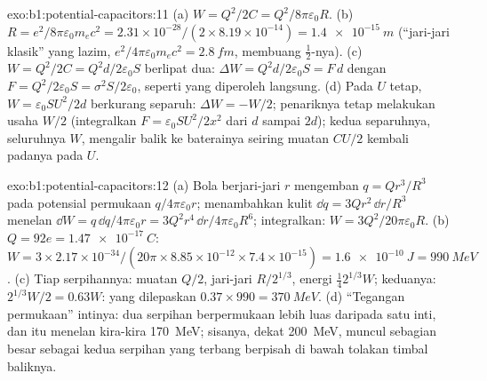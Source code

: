 \begin{solution}{exo:b1:potential-capacitors:11}
(a) $W = Q^2/2C = Q^2/8\pi\varepsilon_0R$. (b) $R = e^2/8\pi\varepsilon_0m_ec^2 = 2.31 \times
10^{-28}/(2 \times 8.19 \times 10^{-14}) = \qty{1.4e-15}{m}$ (``jari-jari klasik''
yang lazim, $e^2/4\pi\varepsilon_0m_ec^2 = \qty{2.8}{fm}$, membuang $\tfrac12$-nya). (c) $W =
Q^2/2C = Q^2d/2\varepsilon_0S$ berlipat dua: $\Delta W = Q^2d/2\varepsilon_0S = F\,d$ dengan $F =
Q^2/2\varepsilon_0S = \sigma^2S/2\varepsilon_0$, seperti yang diperoleh langsung. (d) Pada $U$ tetap, $W =
\varepsilon_0SU^2/2d$ berkurang separuh: $\Delta W = -W/2$; penariknya tetap melakukan usaha $W/2$
(integralkan $F = \varepsilon_0SU^2/2x^2$ dari $d$ sampai $2d$); kedua separuhnya, seluruhnya
$W$, mengalir balik ke baterainya seiring muatan $CU/2$ kembali padanya pada
 $U$.
\end{solution}

\begin{solution}{exo:b1:potential-capacitors:12}
(a) Bola berjari-jari $r$ mengemban $q = Qr^3/R^3$ pada potensial permukaan
$q/4\pi\varepsilon_0r$; menambahkan kulit $\dd q = 3Qr^2\,\dd r/R^3$ menelan $\dd W =
q\,\dd q/4\pi\varepsilon_0r = 3Q^2r^4\,\dd r/4\pi\varepsilon_0R^6$; integralkan: $W =
3Q^2/20\pi\varepsilon_0R$. (b) $Q = 92e = \qty{1.47e-17}{C}$: $W = 3 \times 2.17 \times
10^{-34}/(20\pi \times 8.85 \times 10^{-12} \times 7.4 \times 10^{-15}) = \qty{1.6e-10}{J}
= \qty{990}{MeV}$. (c) Tiap serpihannya: muatan $Q/2$, jari-jari $R/2^{1/3}$,
energi $\tfrac14 2^{1/3}W$; keduanya: $2^{1/3}W/2 = 0.63W$: yang dilepaskan
$0.37 \times 990 = \qty{370}{MeV}$. (d) ``Tegangan permukaan'' intinya:
dua serpihan berpermukaan lebih luas daripada satu inti, dan itu menelan kira-kira
\qty{170}{MeV}; sisanya, dekat \qty{200}{MeV}, muncul sebagian besar sebagai
 kedua serpihan yang terbang berpisah di bawah tolakan
timbal baliknya.
\end{solution}

